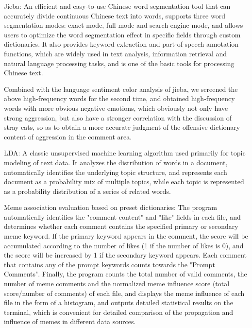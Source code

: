 \documentclass[12pt,a4paper]{ctexart}
\begin{document}
Jieba: An efficient and easy-to-use Chinese word segmentation tool that can accurately divide continuous Chinese text into words, supports three word segmentation modes: exact mode, full mode and search engine mode, and allows users to optimize the word segmentation effect in specific fields through custom dictionaries. It also provides keyword extraction and part-of-speech annotation functions, which are widely used in text analysis, information retrieval and natural language processing tasks, and is one of the basic tools for processing Chinese text.

Combined with the language sentiment color analysis of jieba, we screened the above high-frequency words for the second time, and obtained high-frequency words with more obvious negative emotions, which obviously not only have strong aggression, but also have a stronger correlation with the discussion of stray cats, so as to obtain a more accurate judgment of the offensive dictionary content of aggression in the comment area.

LDA\cite{blei2003latent}: A classic unsupervised machine learning algorithm used primarily for topic modeling of text data. It analyzes the distribution of words in a document, automatically identifies the underlying topic structure, and represents each document as a probability mix of multiple topics, while each topic is represented as a probability distribution of a series of related words.

Meme association evaluation based on preset dictionaries: The program automatically identifies the "comment content" and "like" fields in each file, and determines whether each comment contains the specified primary or secondary meme keyword. If the primary keyword appears in the comment, the score will be accumulated according to the number of likes (1 if the number of likes is 0), and the score will be increased by 1 if the secondary keyword appears. Each comment that contains any of the prompt keywords counts towards the "Prompt Comments". Finally, the program counts the total number of valid comments, the number of meme comments and the normalized meme influence score (total score/number of comments) of each file, and displays the meme influence of each file in the form of a histogram, and outputs detailed statistical results on the terminal, which is convenient for detailed comparison of the propagation and influence of memes in different data sources.
\end{document}
